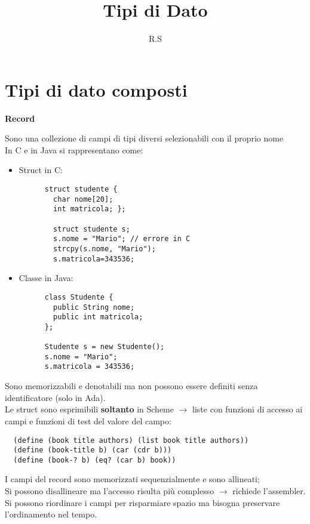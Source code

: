 \documentclass{article}
\title{Tipi di Dato}
\author{R.S}
\begin{document}
\maketitle

\section*{Tipi di dato composti}

\textbf{Record}

\begin{flushleft}

Sono una collezione di campi di tipi diversi selezionabili con il proprio nome \\    
In C e in Java si rappresentano come:
\begin{itemize}
    \item Struct in C: 
    \begin{lstlisting}
      struct studente {
        char nome[20];
        int matricola; };
        
        struct studente s;
        s.nome = "Mario"; // errore in C
        strcpy(s.nome, "Mario");
        s.matricola=343536;
    \end{lstlisting}
    \item Classe in Java:
    \begin{lstlisting}
      class Studente {
        public String nome;
        public int matricola;
      };
      
      Studente s = new Studente();
      s.nome = "Mario";
      s.matricola = 343536;
    \end{lstlisting}
\end{itemize}

Sono memorizzabili e denotabili ma non possono essere definiti senza identificatore (solo in Ada). \\
Le struct sono esprimibili \textbf{soltanto} in Scheme $\rightarrow$ liste con funzioni di accesso ai campi e 
funzioni di test del valore del campo:

\begin{lstlisting}
  (define (book title authors) (list book title authors))
  (define (book-title b) (car (cdr b)))
  (define (book-? b) (eq? (car b) book))
\end{lstlisting}

I campi del record sono memorizzati sequenzialmente e sono allineati; \\
Si possono disallineare ma l'accesso risulta più complesso $\rightarrow$ richiede l'assembler. \\
Si possono riordinare i campi per risparmiare spazio ma bisogna preservare l'ordinamento nel tempo.


\end{flushleft}
\end{document}
